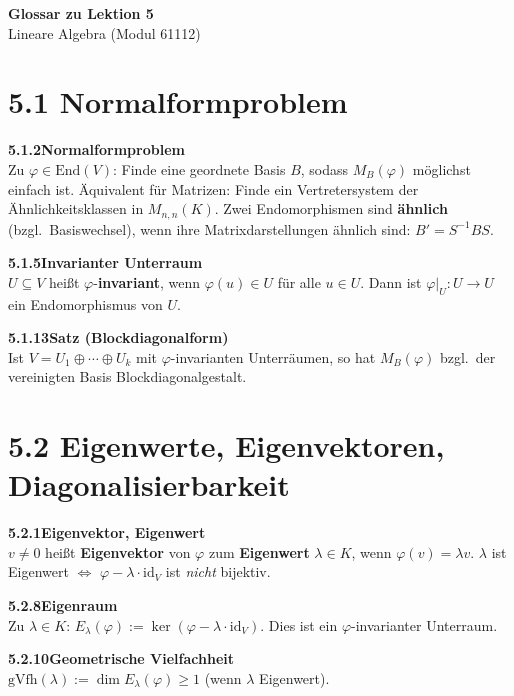 \documentclass[a4paper,12pt]{article}
\newcommand{\gentry}[3]{%
  \noindent\textbf{#1\quad #2}\nopagebreak\\[0.2em]
  #3\par\smallskip
}
\begin{document}
\begin{center}
  {\LARGE\bfseries Glossar zu Lektion 5}\\[0.5em]
  {\large Lineare Algebra (Modul 61112)}
\end{center}

\vspace{0.8em}

\section*{5.1 \quad Normalformproblem}

\gentry{5.1.2}{Normalformproblem}{%
  Zu $\varphi \in \mathrm{End}(V)$: Finde eine geordnete Basis $B$, sodass $M_B(\varphi)$ möglichst einfach ist.
  Äquivalent für Matrizen: Finde ein Vertretersystem der Ähnlichkeitsklassen in $M_{n,n}(K)$.
  Zwei Endomorphismen sind \textbf{ähnlich} (bzgl.\ Basiswechsel), wenn ihre Matrixdarstellungen ähnlich sind: $B' = S^{-1}BS$.
}

\gentry{5.1.5}{Invarianter Unterraum}{%
  $U \subseteq V$ heißt $\varphi$-\textbf{invariant}, wenn $\varphi(u) \in U$ für alle $u \in U$.
  Dann ist $\varphi|_U : U \to U$ ein Endomorphismus von $U$.
}

\gentry{5.1.13}{Satz (Blockdiagonalform)}{%
  Ist $V = U_1 \oplus \cdots \oplus U_k$ mit $\varphi$-invarianten Unterräumen, so hat $M_B(\varphi)$ bzgl.\ der vereinigten Basis Blockdiagonalgestalt.
}

\section*{5.2 \quad Eigenwerte, Eigenvektoren, Diagonalisierbarkeit}

\gentry{5.2.1}{Eigenvektor, Eigenwert}{%
  $v \neq 0$ heißt \textbf{Eigenvektor} von $\varphi$ zum \textbf{Eigenwert} $\lambda \in K$, wenn $\varphi(v) = \lambda v$.
  $\lambda$ ist Eigenwert $\iff$ $\varphi - \lambda \cdot \mathrm{id}_V$ ist \emph{nicht} bijektiv.
}

\gentry{5.2.8}{Eigenraum}{%
  Zu $\lambda \in K$: $E_\lambda(\varphi) := \ker(\varphi - \lambda \cdot \mathrm{id}_V)$. Dies ist ein $\varphi$-invarianter Unterraum.
}

\gentry{5.2.10}{Geometrische Vielfachheit}{%
  $\mathrm{gVfh}(\lambda) := \dim E_\lambda(\varphi) \geq 1$ (wenn $\lambda$ Eigenwert).
}
\end{document}
